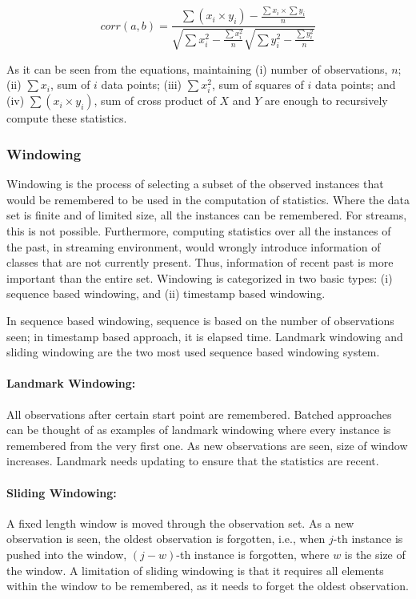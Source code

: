\begin{equation}
\label{eqn:corr}
    corr(a, b) = \frac{ \sum(x_i \times y_i) - \frac{\sum x_i \times \sum y_i}{n} }{\sqrt{\sum x_i^2 - \frac{\sum x_i^2}{n}} \sqrt{\sum y_i^2 - \frac{\sum y_i^2}{n}}}
\end{equation}

As it can be seen from the equations, maintaining (i) number of observations, $n$; (ii) $\sum x_i$, sum of $i$ data points; (iii) $\sum x_i^2$, sum of squares of $i$ data points; and (iv) $\sum (x_i \times y_i)$, sum of cross product of $X$ and $Y$ are enough to recursively compute these statistics.


\subsubsection{Windowing}
Windowing is the process of selecting a subset of the observed instances that would be remembered to be used in the computation of statistics. Where the data set is finite and of limited size, all the instances can be remembered. For streams, this is not possible. Furthermore, computing statistics over all the instances of the past, in streaming environment, would wrongly introduce information of classes that are not currently present. Thus, information of recent past is more important than the entire set. Windowing is categorized in two basic types: (i) sequence based windowing, and (ii) timestamp based windowing.

In sequence based windowing, sequence is based on the number of observations seen; in timestamp based approach, it is elapsed time. Landmark windowing and sliding windowing are the two most used sequence based windowing system.

\paragraph{Landmark Windowing:} All observations after certain start point are remembered. Batched approaches can be thought of as examples of landmark windowing where every instance is remembered from the very first one. As new observations are seen, size of window increases. Landmark needs updating to ensure that the statistics are recent.

\paragraph{Sliding Windowing:} A fixed length window is moved through the observation set. As a new observation is seen, the oldest observation is forgotten, i.e., when $j$-th instance is pushed into the window, $(j-w)$-th instance is forgotten, where $w$ is the size of the window. A limitation of sliding windowing is that it requires all elements within the window to be remembered, as it  needs to forget the oldest observation.

